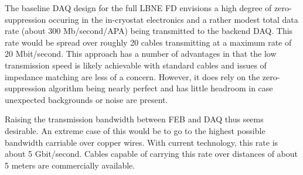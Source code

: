 The baseline DAQ design for the full LBNE FD envisions a high degree of zero-suppression 
occuring in the in-cryostat electronics and a rather modest total data rate (about
300 Mb/second/APA) being transmitted to the backend DAQ.
This rate would be spread over roughly 20 cables transmitting at a maximum rate of 
20 Mbit/second.
This approach has a number of advantages in that the low transmission speed is likely 
achievable with standard cables and issues of impedance matching are less of a concern.
However, it does rely on the zero-suppression algorithm being nearly perfect and has 
little headroom in case unexpected backgrounds or noise are present.

Raising the transmission bandwidth between FEB and DAQ thus seems desirable. 
An extreme case of this would be to go to the highest possible bandwidth carriable over
copper wires.
With current technology, this rate is about 5 Gbit/second. 
Cables capable of carrying this rate over distances of about 5 meters are commercially
available.